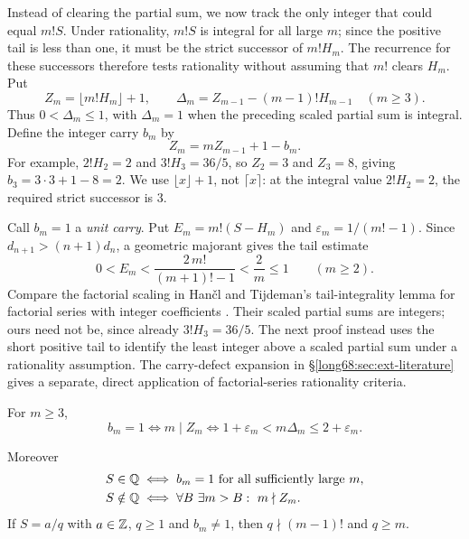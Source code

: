 \documentclass[11pt]{article}
\newcommand{\Ser}{S}
\begin{document}
Instead of clearing the partial sum, we now track the only integer
that could equal $m!S$. Under rationality, $m!S$ is integral for all
large $m$; since the positive tail is less than one, it must be the
strict successor of $m!H_m$. The recurrence for these successors
therefore tests rationality without assuming that $m!$ clears $H_m$. Put
\[
 Z_m=\lfloor m!H_m\rfloor+1,\qquad
 \Delta_m=Z_{m-1}-(m-1)!H_{m-1}\quad(m\ge3).
\]
Thus $0<\Delta_m\le1$, with $\Delta_m=1$ when the preceding
scaled partial sum is integral. Define the integer carry $b_m$ by
\begin{equation}\label{long68:eq:carry-recurrence}
 Z_m=mZ_{m-1}+1-b_m .
\end{equation}
For example, $2!H_2=2$ and $3!H_3=36/5$, so $Z_2=3$ and
$Z_3=8$, giving $b_3=3\cdot3+1-8=2$. We use
$\lfloor x\rfloor+1$, not $\lceil x\rceil$: at the integral value
$2!H_2=2$, the required strict successor is $3$.

Call $b_m=1$ a \emph{unit carry}.  Put
$E_m=m!(\Ser-H_m)$ and $\varepsilon_m=1/(m!-1)$.  Since
$d_{n+1}>(n+1)d_n$, a geometric majorant gives the tail estimate
\begin{equation}\label{long68:eq:tail-bound}
 0<E_m<\frac{2\,m!}{(m+1)!-1}<\frac2m\le1\qquad(m\ge2).
\end{equation}
Compare the factorial scaling in Han\v{c}l and Tijdeman's tail-integrality
lemma for factorial series with integer coefficients
\cite[Lemma~2.1 and the following remark,
p.~385]{hancl-tijdeman}. Their scaled partial sums are integers; ours
need not be, since already $3!H_3=36/5$. The next proof instead uses the
short positive tail to identify the least integer above a scaled partial sum
under a rationality assumption. The carry-defect expansion in
\S\ref{long68:sec:ext-literature} gives a separate, direct application of
factorial-series rationality criteria.

\label{long68:res:lead-carry-equivalence}
\label{long68:res:strict-successor-complete-characterization}
\begin{theorem}\label{long68:res:carry-equivalence}
For $m\ge3$,
\begin{equation}\label{long68:eq:unit-window}
 b_m=1
 \iff m\mid Z_m
 \iff 1+\varepsilon_m<m\Delta_m\le2+\varepsilon_m .
\end{equation}


Moreover
\begin{align}
 \Ser\in\Q
 &\iff b_m=1\ \hbox{for all sufficiently large }m,
 \label{long68:eq:carry-rationality}\\
 \Ser\notin\Q
 &\iff \forall B\ \exists m>B:\ m\nmid Z_m .
 \label{long68:eq:strict-misses}
\end{align}
If $\Ser=a/q$ with $a\in\mathbb{Z}$, $q\ge1$ and $b_m\ne1$, then $q\nmid(m-1)!$ and
$q\ge m$.
\end{theorem}
\end{document}
